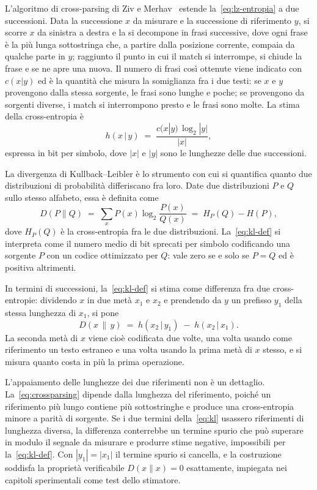 L'algoritmo di cross-parsing di Ziv e Merhav~\cite{ziv1993} estende
la~\eqref{eq:lz-entropia} a due successioni. Data la successione $x$ da
misurare e la successione di riferimento $y$, si scorre $x$ da sinistra a destra
e la si decompone in frasi successive, dove ogni frase è la più lunga
sottostringa che, a partire dalla posizione corrente, compaia da qualche parte
in $y$; raggiunto il punto in cui il match si interrompe, si chiude la frase e
se ne apre una nuova. Il numero di frasi così ottenute viene indicato con
$c(x|y)$ ed è la quantità che misura la somiglianza fra i due testi: se $x$ e
$y$ provengono dalla stessa sorgente, le frasi sono lunghe e poche; se
provengono da sorgenti diverse, i match si interrompono presto e le frasi sono
molte. La stima della cross-entropia è
\begin{equation}
  h(x \,|\, y) \;=\; \frac{c(x|y)\,\log_2 |y|}{|x|},
  \label{eq:crossparsing}
\end{equation}
espressa in bit per simbolo, dove $|x|$ e $|y|$ sono le lunghezze delle due
successioni.

La divergenza di Kullback--Leibler è lo strumento con cui si quantifica quanto
due distribuzioni di probabilità differiscano fra loro. Date due distribuzioni
$P$ e $Q$ sullo stesso alfabeto, essa è definita come
\begin{equation}
  D(P\|Q) \;=\; \sum_{x} P(x) \log_2 \frac{P(x)}{Q(x)}
  \;=\; H_P(Q) - H(P),
  \label{eq:kl-def}
\end{equation}
dove $H_P(Q)$ è la cross-entropia fra le due distribuzioni. La~\eqref{eq:kl-def}
si interpreta come il numero medio di bit sprecati per simbolo codificando una
sorgente $P$ con un codice ottimizzato per $Q$: vale zero se e solo se
$P = Q$ ed è positiva altrimenti.

In termini di successioni, la~\eqref{eq:kl-def} si stima come differenza fra due
cross-entropie: dividendo $x$ in due metà $x_1$ e $x_2$ e prendendo da $y$ un
prefisso $y_1$ della stessa lunghezza di $x_1$, si pone
\begin{equation}
  D(x \,\|\, y) \;=\; h(x_2 \,|\, y_1) \;-\; h(x_2 \,|\, x_1) .
  \label{eq:kl}
\end{equation}
La seconda metà di $x$ viene cioè codificata due volte, una volta usando come
riferimento un testo estraneo e una volta usando la prima metà di $x$ stesso, e
si misura quanto costa in più la prima operazione.

L'appaiamento delle lunghezze dei due riferimenti non è un dettaglio.
La~\eqref{eq:crossparsing} dipende dalla lunghezza del riferimento, poiché un
riferimento più lungo contiene più sottostringhe e produce una cross-entropia
minore a parità di sorgente. Se i due termini della~\eqref{eq:kl} usassero
riferimenti di lunghezza diversa, la differenza conterrebbe un termine spurio
che può superare in modulo il segnale da misurare e produrre stime negative,
impossibili per la~\eqref{eq:kl-def}. Con $|y_1| = |x_1|$ il termine spurio si
cancella, e la costruzione soddisfa la proprietà verificabile $D(x\|x) = 0$
esattamente, impiegata nei capitoli sperimentali come test dello stimatore.

